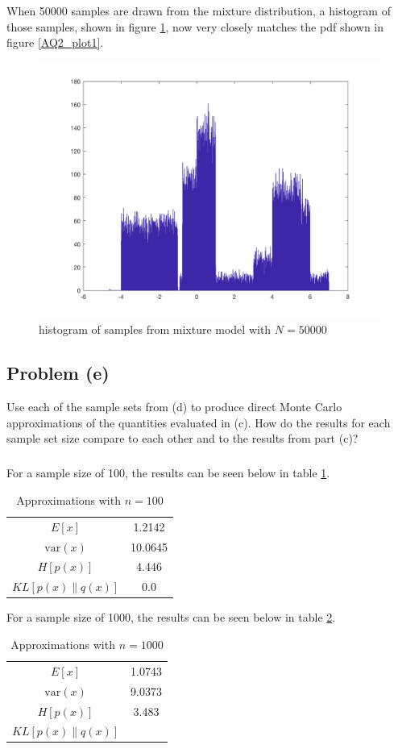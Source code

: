 \documentclass[11pt]{article}
\begin{document}
When 50000 samples are drawn from the mixture distribution, a histogram of those samples, shown in figure \ref{AQ2d_plot3}, now very closely matches the pdf shown in figure \ref{AQ2_plot1}.
\begin{figure}[h!]
	\centering
	\includegraphics[width=0.6\linewidth]{AQ2d_plot3.png}
	\caption{histogram of samples from mixture model with $N=50000$}
	\label{AQ2d_plot3}
\end{figure}


\subsection*{Problem (e)}
Use each of the sample sets from (d) to produce direct Monte Carlo approximations of the quantities evaluated in (c). How do the results for each sample set size compare to each other and to the results from part (c)?

\subparagraph*{}
For a sample size of 100, the results can be seen below in table \ref{tab:table2}.
\begin{table}[h!]
  \begin{center}
    \caption{Approximations with $n=100$}
    \label{tab:table2}
    \begin{tabular}{c|c}
      $E[x]$ & 1.2142 \\
      $\text{var}(x)$ & 10.0645 \\
      $H[p(x)]$ & 4.446 \\
      $KL[p(x)\|q(x)]$ & 0.0 \\
    \end{tabular}
  \end{center}
\end{table}

For a sample size of 1000, the results can be seen below in table \ref{tab:table3}.
\begin{table}[h!]
  \begin{center}
    \caption{Approximations with $n=1000$}
    \label{tab:table3}
    \begin{tabular}{c|c}
      $E[x]$ & 1.0743 \\
      $\text{var}(x)$ & 9.0373 \\
      $H[p(x)]$ & 3.483 \\
      $KL[p(x)\|q(x)]$ &  \\
    \end{tabular}
  \end{center}
\end{table}
\end{document}
